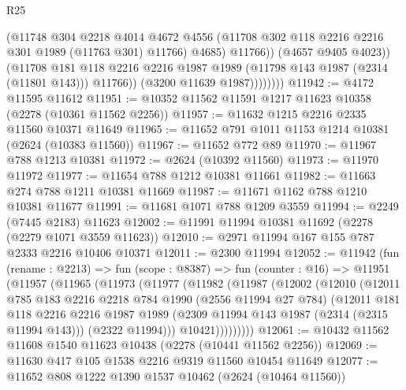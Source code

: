 \begin{lexlean}{R25}
\begin{coremodule}
                          (@11748
                            @304
                            @2218
                            @4014
                            @4672
                            @4556
                            (@11708 @302 @118 @2216 @2216 @301 @1989 (@11763 @301) @11766)
                            @4685)
                          @11766))
                      (@4657 @9405 @4023))
                    (@11708
                      @181
                      @118
                      @2216
                      @2216
                      @1987
                      @1989
                      (@11798 @143 @1987 (@2314 (@11801 @143)))
                      @11766))
                  (@3200 @11639 @1987))))))))
@11942 := @4172 @11595 @11612
@11951 := @10352 @11562 @11591 @1217 @11623 @10358 (@2278 (@10361 @11562 @2256))
@11957 := @11632 @1215 @2216 @2335 @11560 @10371 @11649
@11965 := @11652 @791 @1011 @1153 @1214 @10381 (@2624 (@10383 @11560))
@11967 := @11652 @772 @89
@11970 := @11967 @788 @1213 @10381
@11972 := @2624 (@10392 @11560)
@11973 := @11970 @11972
@11977 := @11654 @788 @1212 @10381 @11661
@11982 := @11663 @274 @788 @1211 @10381 @11669
@11987 := @11671 @1162 @788 @1210 @10381 @11677
@11991 := @11681 @1071 @788 @1209 @3559
@11994 := @2249 (@7445 @2183) @11623
@12002 := @11991 @11994 @10381 @11692 (@2278 (@2279 @1071 @3559 @11623))
@12010 := @2971 @11994 @167 @155 @787 @2333 @2216 @10406 @10371
@12011 := @2300 @11994
@12052 := @11942
    (fun (rename : @2213) =>
    fun (scope : @8387) =>
    fun (counter : @16) =>
    @11951
      (@11957
        (@11965
          (@11973
            (@11977
              (@11982
                (@11987
                  (@12002
                    (@12010
                      (@12011
                        @785
                        @183
                        @2216
                        @2218
                        @784
                        @1990
                        (@2556 @11994 @27 @784)
                        (@12011
                          @181
                          @118
                          @2216
                          @2216
                          @1987
                          @1989
                          (@2309 @11994 @143 @1987 (@2314 (@2315 @11994 @143)))
                          (@2322 @11994)))
                      @10421)))))))))
@12061 := @10432 @11562 @11608 @1540 @11623 @10438 (@2278 (@10441 @11562 @2256))
@12069 := @11630 @417 @105 @1538 @2216 @9319 @11560 @10454 @11649
@12077 := @11652 @808 @1222 @1390 @1537 @10462 (@2624 (@10464 @11560))

\end{coremodule}
\end{lexlean}

